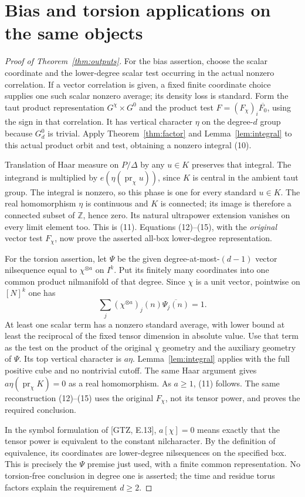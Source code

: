 \documentclass[11pt]{article}
\newcommand{\Z}{\mathbb Z}\newcommand{\R}{\mathbb R}
\begin{document}
\section{Bias and torsion applications on the same objects}
\begin{proof}[Proof of Theorem~\ref{thm:outputs}]
For the bias assertion, choose the scalar coordinate and the lower-degree
scalar test occurring in the actual nonzero correlation. If a vector
correlation is given, a fixed finite coordinate choice supplies one such
scalar nonzero average; its density loss is standard. Form the taut product
representation $G^\chi\times G^0$ and the product test
$F= (F_\chi)_i\overline{F_0}$, using the sign in that correlation.
It has vertical character $\eta$ on the degree-$d$ group because $G^0_d$
is trivial. Apply Theorem~\ref{thm:factor} and Lemma~\ref{lem:integral} to
this actual product orbit and test, obtaining a nonzero integral (10).

Translation of Haar measure on $P/\Delta$ by any $u\in K$ preserves that
integral. The integrand is multiplied by
$e(\eta(\operatorname{pr}_\chi u))$, since $K$ is central in the ambient
taut group. The integral is nonzero, so this phase is one for every
standard $u\in K$. The real homomorphism $\eta$ is continuous and $K$ is
connected; its image is therefore a connected subset of $\Z$, hence zero.
Its natural ultrapower extension vanishes on every limit element too.
This is (11). Equations (12)--(15), with the \emph{original} vector test
$F_\chi$, now prove the asserted all-box lower-degree representation.

For the torsion assertion, let $\Psi$ be the given degree-at-most-$(d-1)$
vector nilsequence equal to $\chi^{\otimes a}$ on $I^k$.
Put its finitely many coordinates into one common product nilmanifold of
that degree. Since $\chi$ is a unit vector, pointwise on $[N]^k$ one has
\[
              \sum_j (\chi^{\otimes a})_j(n)\overline{\Psi_j(n)}=1.
\]
At least one scalar term has a nonzero standard average, with lower bound
at least the reciprocal of the fixed tensor dimension in absolute value.
Use that term as the test on the product of the original $\chi$ geometry
and the auxiliary geometry of $\Psi$. Its top vertical character is
$a\eta$. Lemma~\ref{lem:integral} applies with the full positive cube and
no nontrivial cutoff. The same Haar argument gives
$a\eta(\operatorname{pr}_\chi K)=0$ as a real homomorphism.
As $a\geq1$, (11) follows. The same reconstruction (12)--(15) uses the
original $F_\chi$, not its tensor power, and proves the required conclusion.

In the symbol formulation of [GTZ, E.13],
$a[\chi]=0$ means exactly that the tensor power is equivalent to the
constant nilcharacter. By the definition of equivalence, its coordinates
are lower-degree nilsequences on the specified box. This is precisely the
$\Psi$ premise just used, with a finite common representation.
No torsion-free conclusion in degree one is asserted; the time and residue
torus factors explain the requirement $d\geq2$.
\end{proof}
\end{document}
